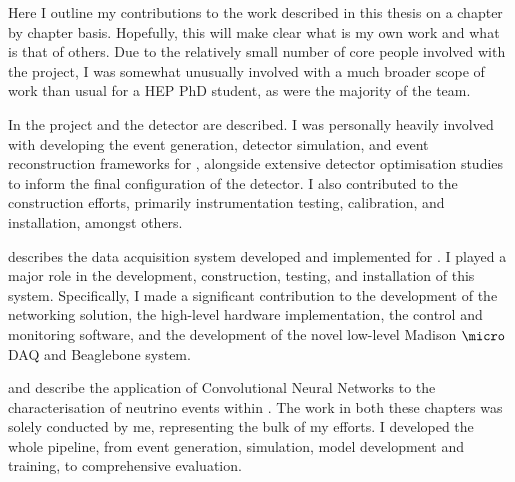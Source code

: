 \begin{preface}
    Here I outline my contributions to the work described in this thesis on a chapter by chapter
    basis. Hopefully, this will make clear what is my own work and what is that of others. Due to
    the relatively small number of core people involved with the \chips project, I was somewhat
    unusually involved with a much broader scope of work than usual for a HEP PhD student, as were
    the majority of the \chips team.

    In  the \chips project and the \chipsfive detector are described. I was
    personally heavily involved with developing the event generation, detector simulation, and
    event reconstruction frameworks for \chips, alongside extensive detector optimisation studies
    to inform the final configuration of the \chipsfive detector. I also contributed to the
    \chipsfive construction efforts, primarily instrumentation testing, calibration, and
    installation, amongst others.

     describes the data acquisition system developed and implemented for
    \chipsfive. I played a major role in the development, construction, testing, and installation
    of this system. Specifically, I made a significant contribution to the development of the
    networking solution, the high-level hardware implementation, the control and monitoring
    software, and the development of the novel low-level Madison $\micro$DAQ and Beaglebone
    system.

     and  describe the application of Convolutional
    Neural Networks to the characterisation of neutrino events within \chipsfive. The work in both
    these chapters was solely conducted by me, representing the bulk of my efforts. I developed
    the whole pipeline, from event generation, simulation, model development and training, to
    comprehensive evaluation.
\end{preface}

\tableofcontents %